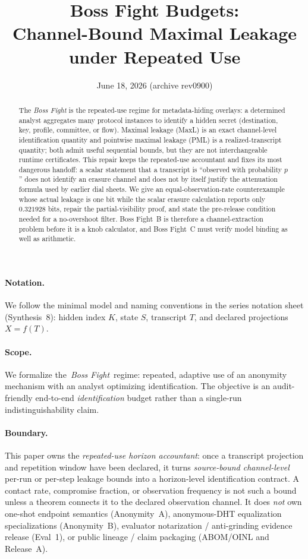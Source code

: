 \documentclass[11pt]{article}
\title{Boss Fight Budgets:\\ Channel-Bound Maximal Leakage under Repeated Use}
\author{}
\date{June 18, 2026 (archive rev0900)}
\begin{document}
\maketitle

\begin{abstract}
The \emph{Boss Fight} is the repeated-use regime for metadata-hiding overlays: a determined analyst aggregates many protocol instances to identify a hidden secret (destination, key, profile, committee, or flow).
Maximal leakage (MaxL) is an exact channel-level identification quantity and pointwise maximal leakage (PML) is a realized-transcript quantity; both admit useful sequential bounds, but they are not interchangeable runtime certificates.
This repair keeps the repeated-use accountant and fixes its most dangerous handoff: a scalar statement that a transcript is ``observed with probability $p$'' does not identify an erasure channel and does not by itself justify the attenuation formula used by earlier dial sheets.
We give an equal-observation-rate counterexample whose actual leakage is one bit while the scalar erasure calculation reports only $0.321928$ bits, repair the partial-visibility proof, and state the pre-release condition needed for a no-overshoot filter.
Boss Fight~B is therefore a channel-extraction problem before it is a knob calculator, and Boss Fight~C must verify model binding as well as arithmetic.
\end{abstract}

\paragraph{Notation.}
We follow the minimal model and naming conventions in the series notation sheet (Synthesis~8): hidden index $K$, state $S$, transcript $T$, and declared projections $X=f(T)$.\cite{series:notation}

\paragraph{Scope.}
We formalize the \,\emph{Boss Fight}\, regime: repeated, adaptive use of an anonymity mechanism with an analyst optimizing identification.
The objective is an audit-friendly end-to-end \emph{identification} budget rather than a single-run indistinguishability claim.

\paragraph{Boundary.}
This paper owns the \emph{repeated-use horizon accountant}: once a transcript projection and repetition window have been declared, it turns \emph{source-bound channel-level} per-run or per-step leakage bounds into a horizon-level identification contract. A contact rate, compromise fraction, or observation frequency is not such a bound unless a theorem connects it to the declared observation channel.
It does \emph{not} own one-shot endpoint semantics (Anonymity~A), anonymous-DHT equalization specializations (Anonymity~B), evaluator notarization / anti-grinding evidence release (Eval~1), or public lineage / claim packaging (ABOM/OINL and Release~A).\cite{series:oddsinflation,series:profiling,series:evalnotary,series:abomoinl,series:releaseproperty}
\end{document}
